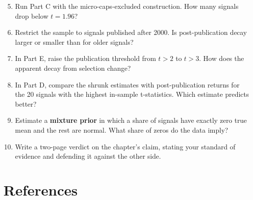 \begin{enumerate}
  \setcounter{enumi}{4}
  \item Run Part C with the micro-caps-excluded construction. How many signals drop below $t = 1.96$?
  \item Restrict the sample to signals published after 2000. Is post-publication decay larger or smaller than for older signals?
  \item In Part E, raise the publication threshold from $t > 2$ to $t > 3$. How does the apparent decay from selection change?
  \item In Part D, compare the shrunk estimates with post-publication returns for the 20 signals with the highest in-sample t-statistics. Which estimate predicts better?
  \item Estimate a \textbf{mixture prior} in which a share of signals have exactly zero true mean and the rest are normal. What share of zeros do the data imply?
  \item Write a two-page verdict on the chapter's claim, stating your standard of evidence and defending it against the other side.
\end{enumerate}

\section*{References}

